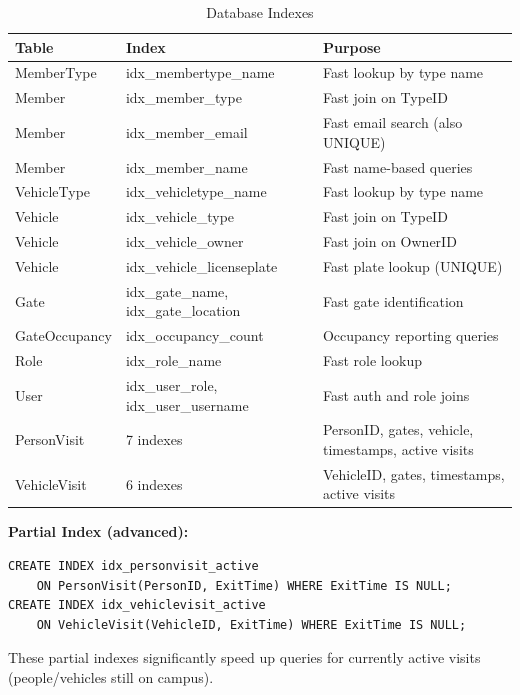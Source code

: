 \documentclass[a4paper, 12pt]{article}
\begin{document}
\begin{table}[H]
\centering
\caption{Database Indexes}
\label{tab:indexes}
\small
\begin{tabularx}{\textwidth}{l l X}
\toprule
\textbf{Table} & \textbf{Index} & \textbf{Purpose} \\
\midrule
MemberType & idx\_membertype\_name & Fast lookup by type name \\
Member & idx\_member\_type & Fast join on TypeID \\
Member & idx\_member\_email & Fast email search (also UNIQUE) \\
Member & idx\_member\_name & Fast name-based queries \\
VehicleType & idx\_vehicletype\_name & Fast lookup by type name \\
Vehicle & idx\_vehicle\_type & Fast join on TypeID \\
Vehicle & idx\_vehicle\_owner & Fast join on OwnerID \\
Vehicle & idx\_vehicle\_licenseplate & Fast plate lookup (UNIQUE) \\
Gate & idx\_gate\_name, idx\_gate\_location & Fast gate identification \\
GateOccupancy & idx\_occupancy\_count & Occupancy reporting queries \\
Role & idx\_role\_name & Fast role lookup \\
User & idx\_user\_role, idx\_user\_username & Fast auth and role joins \\
PersonVisit & 7 indexes & PersonID, gates, vehicle, timestamps, active visits \\
VehicleVisit & 6 indexes & VehicleID, gates, timestamps, active visits \\
\bottomrule
\end{tabularx}
\end{table}

\textbf{Partial Index (advanced):}
\begin{lstlisting}[style=sqlstyle, caption={Partial Index for Active Visits}, label={lst:partial-idx}]
CREATE INDEX idx_personvisit_active
    ON PersonVisit(PersonID, ExitTime) WHERE ExitTime IS NULL;
CREATE INDEX idx_vehiclevisit_active
    ON VehicleVisit(VehicleID, ExitTime) WHERE ExitTime IS NULL;
\end{lstlisting}
These partial indexes significantly speed up queries for currently active visits (people/vehicles still on campus).

\newpage
\end{document}
